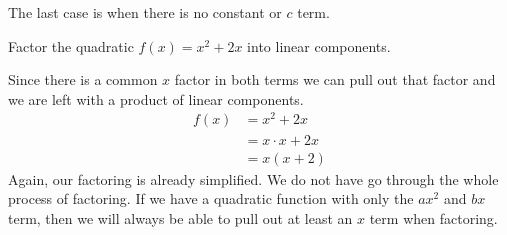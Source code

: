 \documentclass{ximera}
\begin{document}
The last case is when there is no constant or $c$ term. 
\begin{example}
Factor the quadratic $f(x) = x^2+2x$ into linear components.\\

\begin{explanation}
Since there is a common $x$ factor in both terms we can pull out that factor and we are left with a product of linear components. 
\begin{align*}
f(x) &= x^2+2x\\
&= x\cdot x+2x\\
&=x(x+2)
\end{align*}
Again, our factoring is already simplified. We do not have go through the whole process of factoring. If we have a quadratic function with only the $ax^2$ and $bx$ term, then we will always be able to pull out at least an $x$ term when factoring.
\end{explanation}
\end{example}

 
\end{document}
